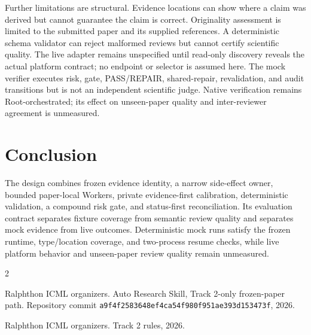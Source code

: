 \documentclass{article}
\begin{document}
Further limitations are structural. Evidence locations can show where a claim
was derived but cannot guarantee the claim is correct. Originality assessment
is limited to the submitted paper and its supplied references. A deterministic
schema validator can reject malformed reviews but cannot certify scientific
quality. The live adapter remains unspecified until read-only discovery reveals
the actual platform contract; no endpoint or selector is assumed here.
The mock verifier executes risk, gate, PASS/REPAIR, shared-repair, revalidation,
and audit transitions but is not an independent scientific judge. Native
verification remains Root-orchestrated; its effect on unseen-paper quality and
inter-reviewer agreement is unmeasured.

\newpage
\section{Conclusion}

The design combines frozen evidence identity, a narrow side-effect owner,
bounded paper-local Workers, private evidence-first calibration, deterministic
validation, a compound risk gate, and status-first reconciliation. Its
evaluation contract separates fixture coverage from semantic review quality
and separates mock evidence from live outcomes. Deterministic mock runs satisfy
the frozen runtime, type/location coverage, and two-process resume checks,
while live platform behavior and unseen-paper review quality remain unmeasured.

\begin{thebibliography}{2}

Ralphthon ICML organizers.
\newblock Auto Research Skill, Track 2-only frozen-paper path.
\newblock Repository commit
\nolinkurl{a9f4f2583648ef4ca54f980f951ae393d153473f}, 2026.

Ralphthon ICML organizers.
\newblock Track 2 rules, 2026.

\end{thebibliography}
\end{document}
